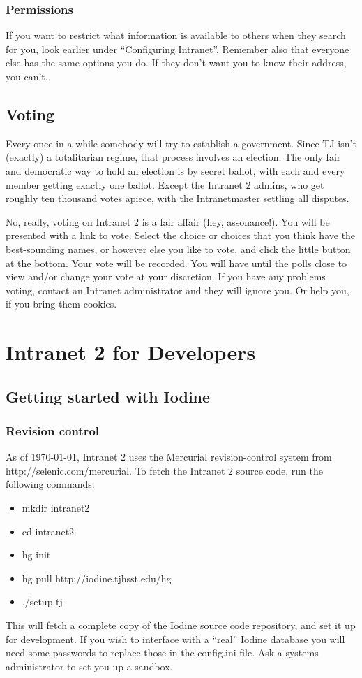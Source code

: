\documentclass[11pt,letterpaper]{report}
\begin{document}
\subsection{Permissions}
If you want to restrict what information is available to others when they search
for you, look earlier under ``Configuring Intranet''.  Remember also that
everyone else has the same options you do.  If they don't want you to know their
address, you can't.
\section{Voting}
Every once in a while somebody will try to establish a government.  Since TJ
isn't (exactly) a totalitarian regime, that process involves an election.
The only fair and democratic way to hold an election is by secret ballot, with
each and every member getting exactly one ballot.  Except the Intranet 2 admins,
who get roughly ten thousand votes apiece, with the Intranetmaster settling all
disputes.

No, really, voting on Intranet 2 is a fair affair (hey, assonance!).  You will
be presented with a link to vote.  Select the choice or choices that you think
have the best-sounding names, or however else you like to vote, and click the
little button at the bottom.  Your vote will be recorded.  You will have until
the polls close to view and/or change your vote at your discretion.  If you have
any problems voting, contact an Intranet administrator and they will ignore you.
Or help you, if you bring them cookies.
\chapter{Intranet 2 for Developers}
\section{Getting started with Iodine}
\subsection{Revision control}
As of \today , Intranet 2 uses the Mercurial revision-control system from http://selenic.com/mercurial.  
To fetch the Intranet 2 source code, run the following commands:
\begin{itemize}
	\item mkdir intranet2
	\item cd intranet2
	\item hg init
	\item hg pull http://iodine.tjhsst.edu/hg
	\item ./setup tj
\end{itemize}
This will fetch a complete copy of the Iodine source code repository, and
set it up for development.  If you wish to interface with a ``real''
Iodine database you will need some passwords to replace those in the config.ini
file.  Ask a systems administrator to set you up a sandbox.
\end{document}
